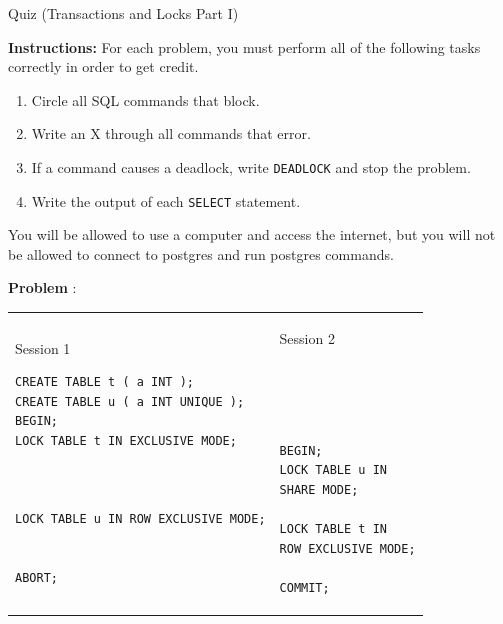 \documentclass[10pt]{article}
\theoremstyle{definition}
\newcounter{ProblemCounter}
\newcommand{\nextproblem}{\filbreak\stepcounter{ProblemCounter} \noindent\textbf{Problem \theProblemCounter}:}
\begin{document}
\begin{center}
{
\Large
    Quiz (Transactions and Locks Part I)
}

    \vspace{0.1in}
\end{center}

\noindent
\textbf{Instructions:}
For each problem, you must perform all of the following tasks correctly in order to get credit.
\begin{enumerate}
\item Circle all SQL commands that block.
\item Write an X through all commands that error.
\item If a command causes a deadlock, write \lstinline{DEADLOCK} and stop the problem.
\item Write the output of each \lstinline{SELECT} statement.
\end{enumerate}
    You will be allowed to use a computer and access the internet, but you will not be allowed to connect to postgres and run postgres commands.

\vspace{0.25in}

\nextproblem
\begin{tcolorbox}
\begin{tabular}{p{3.25in}p{3in}}
\hspace{-0.2in}Session 1
\begin{lstlisting}
CREATE TABLE t ( a INT );
CREATE TABLE u ( a INT UNIQUE );
BEGIN;
LOCK TABLE t IN EXCLUSIVE MODE;
  


LOCK TABLE u IN ROW EXCLUSIVE MODE;


ABORT;
\end{lstlisting}
    &
\hspace{-0.2in}Session 2
\begin{lstlisting}




BEGIN;
LOCK TABLE u IN
SHARE MODE;

LOCK TABLE t IN
ROW EXCLUSIVE MODE;

COMMIT;

\end{lstlisting}
\end{tabular}
\end{tcolorbox}
\vspace{0.25in}
\end{document}
